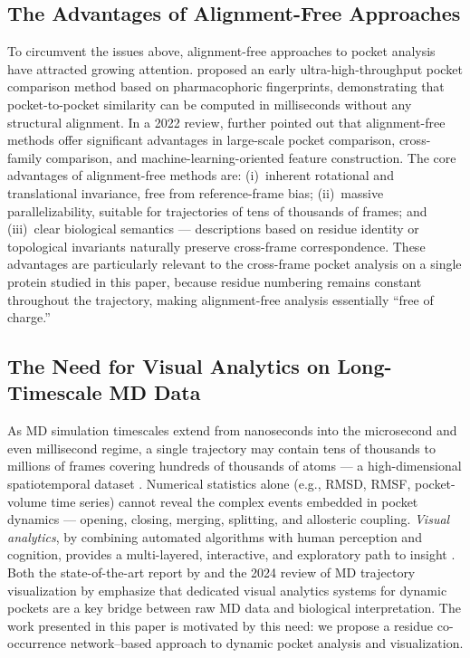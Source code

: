 \documentclass[11pt,a4paper]{article}
\begin{document}
\subsection{The Advantages of Alignment-Free Approaches}
To circumvent the issues above, alignment-free approaches to pocket
analysis have attracted growing attention. \citet{weill2010alignment}
proposed an early ultra-high-throughput pocket comparison method
based on pharmacophoric fingerprints, demonstrating that
pocket-to-pocket similarity can be computed in milliseconds without
any structural alignment. In a 2022 review,
\citet{eguida2022estimating} further pointed out that alignment-free
methods offer significant advantages in large-scale pocket
comparison, cross-family comparison, and machine-learning-oriented
feature construction. The core advantages of alignment-free methods
are: (i)~inherent rotational and translational invariance, free from
reference-frame bias; (ii)~massive parallelizability, suitable for
trajectories of tens of thousands of frames; and (iii)~clear
biological semantics --- descriptions based on residue identity or
topological invariants naturally preserve cross-frame correspondence.
These advantages are particularly relevant to the cross-frame pocket
analysis on a single protein studied in this paper, because residue
numbering remains constant throughout the trajectory, making
alignment-free analysis essentially ``free of charge.''

\subsection{The Need for Visual Analytics on Long-Timescale MD Data}
As MD simulation timescales extend from nanoseconds into the
microsecond and even millisecond regime, a single trajectory may
contain tens of thousands to millions of frames covering hundreds
of thousands of atoms --- a high-dimensional spatiotemporal dataset
\citep{vant2024complex}. Numerical statistics alone (e.g., RMSD,
RMSF, pocket-volume time series) cannot reveal the complex events
embedded in pocket dynamics --- opening, closing, merging,
splitting, and allosteric coupling. \emph{Visual analytics}, by
combining automated algorithms with human perception and cognition,
provides a multi-layered, interactive, and exploratory path to
insight \citep{krone2016visual,parulek2013visual,vant2024complex}.
Both the state-of-the-art report by \citet{krone2016visual} and the
2024 review of MD trajectory visualization by
\citet{vant2024complex} emphasize that dedicated visual analytics
systems for dynamic pockets are a key bridge between raw MD data and
biological interpretation. The work presented in this paper is
motivated by this need: we propose a residue co-occurrence
network--based approach to dynamic pocket analysis and visualization.
\end{document}

